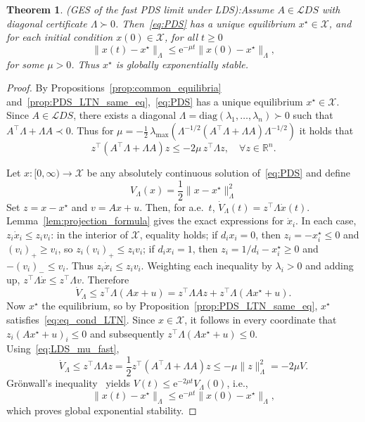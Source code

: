 \documentclass[letterpaper, conference]{ieeeconf}
\newcommand{\R}{\mathbb R}
\newcommand{\X}{\mathcal X}
\newtheorem{theorem}{Theorem}[section]
\newcommand{\longthmtitle}[1]{\mbox{}{\textit{(#1):}}}
\newcommand{\1}{\mathbf{1}}
\newcommand{\mc}{\mathcal}
\newcommand{\diag}{\mathrm{diag}}
\begin{document}
\begin{theorem}\longthmtitle{GES of the fast PDS limit under LDS}\label{thm:PDS_GES}
Assume \(A\in\mc LDS\) with diagonal certificate \(\Lambda \succ 0\). 
Then~\eqref{eq:PDS} has a unique equilibrium \(x^\star\in\X\), and for each initial condition \(x(0) \in \X\), for all \(t\geq0\)
\[
\lVert x(t)-x^\star\rVert_{\Lambda}\le \mathrm{e}^{-\mu t} \lVert x(0)-x^\star\rVert_{\Lambda},
\]
for some \(\mu>0\). 
Thus \(x^\star\) is globally exponentially stable.
\end{theorem}
\begin{proof}
By Propositions~\ref{prop:common_equilibria} and~\ref{prop:PDS_LTN_same_eq},~\eqref{eq:PDS} has a unique equilibrium \(x^\star\in\X\).
Since \(A\in\mc LDS\), there exists a diagonal \(\Lambda=\diag(\lambda_1,\dots,\lambda_n)\succ0\) such that
\(A^\top\Lambda+\Lambda A\prec0\).
Thus for \(\mu = -\frac12\,\lambda_{\max}\left(\Lambda^{-1/2}(A^\top\Lambda+\Lambda A)\Lambda^{-1/2}\right)\) it holds that
\begin{equation}\label{eq:LDS_mu_fast}
z^\top(A^\top\Lambda+\Lambda A)z
\le -2\mu\, z^\top\Lambda z ,
\quad \forall z\in\R^n.
\end{equation}

Let \(x:[0,\infty) \rightarrow \X\) be any absolutely continuous solution of~\eqref{eq:PDS} and define
\begin{equation}\label{eq:fast_Lyap}
    V_\Lambda(x)=\frac12 \lVert x-x^\star\rVert_\Lambda^2
\end{equation}
Set \(z=x-x^\star\) and \(v=Ax+u\).
Then, for a.e.\ \(t\), \(\dot V_\Lambda(t)=z^\top \Lambda\dot x(t)\).
Lemma~\ref{lem:projection_formula} gives the exact expressions for \(\dot x_i\).
In each case, \(z_i\dot x_i\le z_i v_i\):
in the interior of \(\X\), equality holds; 
if \(d_ix_i=0\), then \(z_i=-x_i^\star\le0\) and \((v_i)_+\ge v_i\), so \(z_i(v_i)_+\le z_i v_i\);
if \(d_i x_i=1\), then \(z_i=1/d_i-x_i^\star\ge0\) and \(-(v_i)_-\le v_i\). 
Thus \(z_i\dot x_i\le z_i v_i\). Weighting each inequality by \(\lambda_i>0\) and adding up, \(z^\top \Lambda \dot x \leq z^\top \Lambda v\). 
Therefore
\[
\dot V_\Lambda
\le
z^\top\Lambda(Ax+u)
=
z^\top\Lambda A z+z^\top\Lambda(Ax^\star+u).
\]
Now \(x^\star\) the equilibrium, so by Proposition~\ref{prop:PDS_LTN_same_eq}, \(x^\star\) satisfies~\eqref{eq:eq_cond_LTN}.
Since \(x\in\X\), it follows in every coordinate that \(z_i(Ax^\star+u)_i \le 0\) and subsequently \(z^\top\Lambda(Ax^\star+u) \le 0\).
Using~\eqref{eq:LDS_mu_fast},
\[\dot V_\Lambda\le z^\top\Lambda A z = \frac12 z^\top(A^\top\Lambda+\Lambda A)z \le -\mu \lVert z\rVert_\Lambda^2=-2\mu V.\]
Gr\"onwall's inequality~\cite{HK:02} yields \(V(t)\le \mathrm{e}^{-2\mu t}V_\Lambda(0)\), i.e.,
\[\lVert x(t)-x^\star\rVert _\Lambda\le \mathrm{e}^{-\mu t}\lVert x(0)-x^\star\rVert_\Lambda,\]
which proves global exponential stability.
\end{proof}
\end{document}
